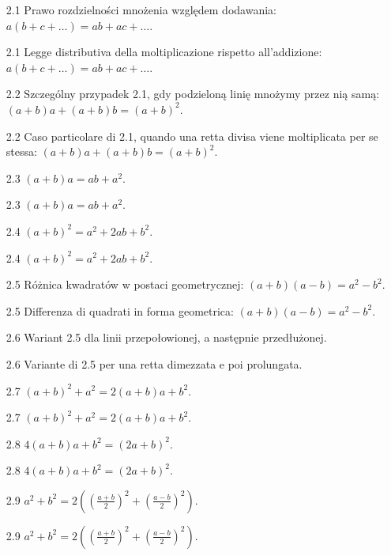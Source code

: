 \begin{enumerate}
    \item [2.1] Prawo rozdzielności mnożenia względem dodawania: $a(b+c+\ldots) = ab+ac+\ldots$. %
    \item [2.1] Legge distributiva della moltiplicazione rispetto all'addizione: $a(b+c+\ldots) = ab+ac+\ldots$. %

    \item [2.2] Szczególny przypadek 2.1, gdy podzieloną linię mnożymy przez nią samą: $(a+b)a+(a+b)b=(a+b)^2$. %
    \item [2.2] Caso particolare di 2.1, quando una retta divisa viene moltiplicata per se stessa: $(a+b)a+(a+b)b=(a+b)^2$. %

    \item [2.3] $(a+b)a = ab + a^2$. %
    \item [2.3] $(a+b)a = ab + a^2$. %

    \item [2.4] $(a+b)^2 = a^2+2ab+b^2$. %
    \item [2.4] $(a+b)^2 = a^2+2ab+b^2$. %

    \item [2.5] Różnica kwadratów w postaci geometrycznej: $(a+b)(a-b)=a^2-b^2$. %
    \item [2.5] Differenza di quadrati in forma geometrica: $(a+b)(a-b)=a^2-b^2$. %

    \item [2.6] Wariant 2.5 dla linii przepołowionej, a następnie przedłużonej. %
    \item [2.6] Variante di 2.5 per una retta dimezzata e poi prolungata. %

    \item [2.7] $(a+b)^2+a^2 = 2(a+b)a+b^2$. %
    \item [2.7] $(a+b)^2+a^2 = 2(a+b)a+b^2$. %

    \item [2.8] $4(a+b)a+b^2=(2a+b)^2$. %
    \item [2.8] $4(a+b)a+b^2=(2a+b)^2$. %

    \item [2.9] $a^2+b^2 = 2\left(\left(\frac{a+b}2\right)^2+\left(\frac{a-b}2\right)^2\right)$. %
    \item [2.9] $a^2+b^2 = 2\left(\left(\frac{a+b}2\right)^2+\left(\frac{a-b}2\right)^2\right)$. %


\end{enumerate}

